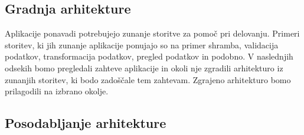 \subsection{Gradnja arhitekture}

Aplikacije ponavadi potrebujejo zunanje storitve za
pomoč pri delovanju.
Primeri storitev, ki jih zunanje aplikacije ponujajo so na primer
shramba, validacija podatkov, transformacija podatkov, pregled podatkov in podobno.
V naslednjih odsekih bomo pregledali zahteve aplikacije
in okoli nje zgradili arhitekturo iz zunanjih storitev, ki bodo zadoščale tem zahtevam.
Zgrajeno arhitekturo bomo prilagodili na izbrano okolje.







\subsection{Posodabljanje arhitekture}